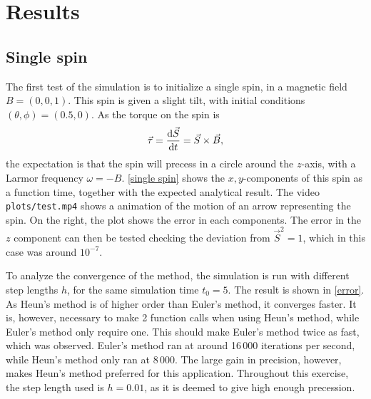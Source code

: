 \documentclass{article}
\begin{document}
    \section*{Results}
    \subsection*{Single spin}

    The first test of the simulation is to initialize a single spin, in a magnetic field $B = (0, 0, 1)$.
    This spin is given a slight tilt, with initial conditions $(\theta, \phi) = (0.5, 0)$.
    As the torque on the spin is 
    \begin{equation*}
        \vec \tau = \dv{\vec S}{t} = \vec{S} \times \vec{B},
    \end{equation*}
    the expectation is that the spin will precess in a circle around the $z$-axis, with a Larmor frequency $\omega = -B$.
    \autoref{single spin} shows the $x,y$-components of this spin as a function time, together with the expected analytical result.
    The video \verb|plots/test.mp4| shows a animation of the motion of an arrow representing the spin. On the right, the plot shows the error in each components.
    The error in the $z$ component can then be tested checking the deviation from $\vec S^2=1$, which in this case was around $10^{-7}$.

    To analyze the convergence of the method, the simulation is run with different step lengths $h$, for the same simulation time $t_0 = 5$.
    The result is shown in \autoref{error}.
    As Heun's method is of higher order than Euler's method, it converges faster.
    It is, however, necessary to make 2 function calls when using Heun's method, while Euler's method only require one.
    This should make Euler's method twice as fast, which was observed.
    Euler's method ran at around 16\,000 iterations per second, while Heun's method only ran at 8\,000.
    The large gain in precision, however, makes Heun's method preferred for this application. 
    Throughout this exercise, the step length used is $h=0.01$, as it is deemed to give high enough precession.
\end{document}
